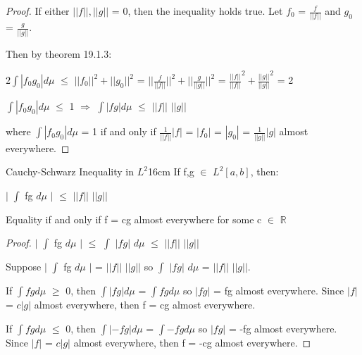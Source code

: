     \begin{proof}
        If either $||f||,||g||$ = 0, then the inequality holds true.
        Let $f_0$ = $\frac{f}{||f||}$ and $g_0$ = $\frac{g}{||g||}$.

        Then by {\color{red} theorem 19.1.3}:

        \hspace{0.5cm}
        $2 \int |f_0g_0| d\mu$
        $\leq$ $||f_0||^2 + ||g_0||^2$
        = $||\frac{f}{||f||}||^2 + ||\frac{g}{||g||}||^2$
        = $\frac{||f||}{||f||}^2 + \frac{||g||}{||g||}^2$
        = 2

        \hspace{0.5cm}
        $\int |f_0g_0| d\mu$ $\leq$ 1
        \hspace{0.5cm}
        $\Rightarrow$
        \hspace{0.5cm}
        $\int |fg| d\mu$ $\leq$ $||f||$ $||g||$

        where $\int |f_0g_0| d\mu$ = 1 if and only if
        $\frac{1}{||f||}|f|$ = $|f_0|$ = $|g_0|$ = $\frac{1}{||g||}|g|$
        almost everywhere.
    \end{proof}

    \newpage



    \begin{corollary}{Cauchy-Schwarz Inequality in $L^2$}{16cm}
        If f,g $\in$ $L^2[a,b]$, then:
        
        \hspace{0.5cm}
        $|$ $\int$ fg $d\mu$ $|$ $\leq$ $||f||$ $||g||$

        Equality if and only if
        f = cg almost everywhere for some c $\in$ $\mathbb{R}$ 
    \end{corollary}

    \begin{proof}
        $|$ $\int$ fg $d\mu$ $|$
        $\leq$ $\int$ $|fg|$ $d\mu$
        $\leq$ $||f||$ $||g||$

        Suppose $|$ $\int$ fg $d\mu$ $|$ = $||f||$ $||g||$
        so $\int$ $|fg|$ $d\mu$ = $||f||$ $||g||$.

        If $\int fg d\mu$ $\geq$ 0, then $\int |fg| d\mu$ = $\int fg d\mu$
        so $|fg|$ = fg almost everywhere.
        Since $|f|$ = $c|g|$ almost everywhere, then
        f = cg almost everywhere.

        If $\int fg d\mu$ $\leq$ 0, then $\int |-fg| d\mu$ = $\int -fg d\mu$
        so $|fg|$ = -fg almost everywhere.
        Since $|f|$ = $c|g|$ almost everywhere, then
        f = -cg almost everywhere.
    \end{proof}

